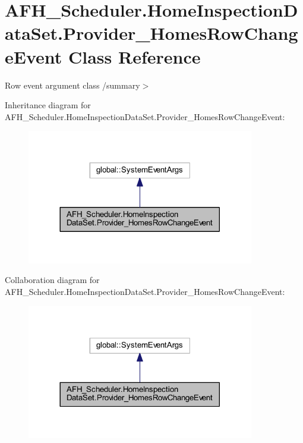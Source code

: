 \section{A\+F\+H\+\_\+\+Scheduler.\+Home\+Inspection\+Data\+Set.\+Provider\+\_\+\+Homes\+Row\+Change\+Event Class Reference}
\label{class_a_f_h___scheduler_1_1_home_inspection_data_set_1_1_provider___homes_row_change_event}


Row event argument class /summary$>$  




Inheritance diagram for A\+F\+H\+\_\+\+Scheduler.\+Home\+Inspection\+Data\+Set.\+Provider\+\_\+\+Homes\+Row\+Change\+Event\+:
\nopagebreak
\begin{figure}[H]
\begin{center}
\leavevmode
\includegraphics[width=281pt]{class_a_f_h___scheduler_1_1_home_inspection_data_set_1_1_provider___homes_row_change_event__inherit__graph}
\end{center}
\end{figure}


Collaboration diagram for A\+F\+H\+\_\+\+Scheduler.\+Home\+Inspection\+Data\+Set.\+Provider\+\_\+\+Homes\+Row\+Change\+Event\+:
\nopagebreak
\begin{figure}[H]
\begin{center}
\leavevmode
\includegraphics[width=281pt]{class_a_f_h___scheduler_1_1_home_inspection_data_set_1_1_provider___homes_row_change_event__coll__graph}
\end{center}
\end{figure}
